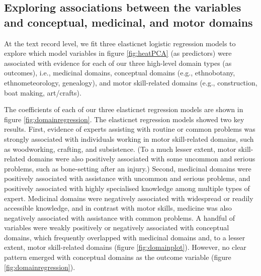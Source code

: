 \documentclass[
  11pt,
]{article}
\begin{document}
\hypertarget{exploring-associations-between-the-variables-and-conceptual-medicinal-and-motor-domains}{%
\subsection{Exploring associations between the variables and conceptual, medicinal, and motor domains}\label{exploring-associations-between-the-variables-and-conceptual-medicinal-and-motor-domains}}

At the text record level, we fit three elasticnet logistic regression models to explore which model variables in figure \ref{fig:heatPCA} (as predictors) were associated with evidence for each of our three high-level domain types (as outcomes), i.e., medicinal domains, conceptual domains (e.g., ethnobotany, ethnometeorology, genealogy), and motor skill-related domains (e.g., construction, boat making, art/crafts).

The coefficients of each of our three elasticnet regression models are shown in figure \ref{fig:domainregression}. The elasticnet regression models showed two key results. First, evidence of experts assisting with routine or common problems was strongly associated with individuals working in motor skill-related domains, such as woodworking, crafting, and subsistence. (To a much lesser extent, motor skill-related domains were also positively associated with some uncommon and serious problems, such as bone-setting after an injury.) Second, medicinal domains were positively associated with assistance with uncommon and serious problems, and positively associated with highly specialised knowledge among multiple types of expert. Medicinal domains were negatively associated with widespread or readily accessible knowledge, and in contrast with motor skills, medicine was also negatively associated with assistance with common problems. A handful of variables were weakly positively or negatively associated with conceptual domains, which frequently overlapped with medicinal domains and, to a lesser extent, motor skill-related domains (figure \ref{fig:domainplot}). However, no clear pattern emerged with conceptual domains as the outcome variable (figure \ref{fig:domainregression}).
\end{document}

